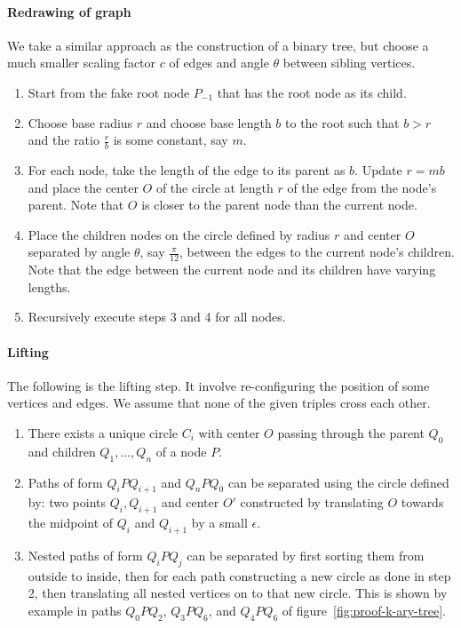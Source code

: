 \documentclass{NSF}
\begin{document}
\paragraph{Redrawing of graph} We take a similar approach as the construction of a binary tree, but choose a much smaller scaling factor $c$ of edges and angle $\theta$ between sibling vertices. 
\begin{enumerate}
\item Start from the fake root node $P_{-1}$ that has the root node as its child. 
\item Choose base radius $r$ and choose base length $b$ to the root such that $b>r$ and the ratio $\frac{r}{b}$ is some constant, say $m$. 
\item For each node, take the length of the edge to its parent as $b$. Update $r=mb$ and place the center $O$ of the circle at length $r$ of the edge from the node's parent. Note that $O$ is closer to the parent node than the current node.
\item Place the children nodes on the circle defined by radius $r$ and center $O$ separated by angle $\theta$, say $\frac{\pi}{12}$, between the edges to the current node's children. Note that the edge between the current node and its children have varying lengths.
\item Recursively execute steps 3 and 4 for all nodes.
\end{enumerate}

\paragraph{Lifting} The following is the lifting step. It involve re-configuring the position of some vertices and edges. We assume that none of the given triples cross each other.
\begin{enumerate}
\item There exists a unique circle $C_i$ with center $O$ passing through the parent $Q_0$ and children $Q_1, \dots , Q_n$ of a node $P$.
\item Paths of form $Q_iPQ_{i+1}$ and $Q_nPQ_0$  can be separated using the circle defined by: two points $Q_i, Q_{i+1}$ and center $O'$ constructed by translating $O$ towards the midpoint of $Q_i$ and $Q_{i+1}$ by a small $\epsilon$.
\item Nested paths of form $Q_iPQ_j$ can be separated by first sorting them from outside to inside, then for each path constructing a new circle as done in step 2, then translating all nested vertices on to that new circle. This is shown by example in paths $Q_0PQ_2$, $Q_3PQ_6$, and $Q_4PQ_6$ of figure~\ref{fig:proof-k-ary-tree}.
\end{enumerate}
\end{document}
